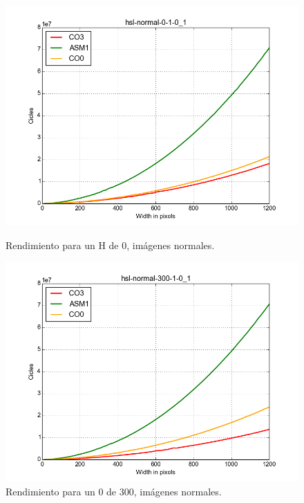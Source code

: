 \documentclass[a4paper]{article}
\begin{document}
\begin{figure}[H]
  \begin{center}
    \includegraphics[scale=0.4]{imagenes/hsl1.png}
    \caption{Rendimiento para un H de 0, imágenes normales.}
    \label{fig:exp1-1}
  \end{center}
  \endminipage\hfill
  \begin{center}
    \includegraphics[scale=0.4]{imagenes/hsl2.png}
    \caption{Rendimiento para un 0 de 300, imágenes normales.}
    \label{fig:exp1-0.5}
  \end{center}
  \endminipage\hfill
\end{figure}
\end{document}
